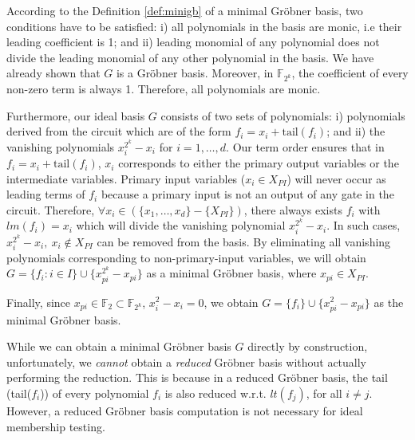 \begin{Proof}
According to the Definition \ref{def:minigb} of a minimal Gr\"obner basis, two
conditions have to be satisfied: i) all polynomials in the basis are
monic, i.e their leading coefficient is 1; and ii) leading monomial of
any polynomial does not divide the leading monomial of any other
polynomial in the basis. 
We have already shown that $G$ is a Gr\"obner basis. Moreover, in
$\mathbb{F}_{2^k}$, the coefficient of every non-zero term is always
1. Therefore, all polynomials are monic. 

Furthermore, our ideal basis $G$ consists of two sets of polynomials:
i) polynomials derived from the circuit which are of the form $f_i =
x_i + \text{tail}(f_i)$; and ii) the vanishing polynomials $x_i^{2^k}
- x_i$ for $i = 1, \dots, d$. Our term order ensures that in $f_i =
x_i + \text{tail}(f_i)$, $x_i$ corresponds to either the primary
output variables or the intermediate variables. Primary input
variables ($x_i \in X_{PI}$) will never occur as leading terms of
$f_i$ because a primary input is not an output of any gate in the
circuit. Therefore,  $\forall x_i \in (\{x_1, \ldots,
x_d\}-\{X_{PI}\})$, there always exists $f_{i}$ with
$lm(f_{i})=x_{i}$ which will divide the vanishing polynomial
$x_i^{2^k} - x_i$. In such cases, $x_{i}^{2^k}-x_{i}, ~x_i \notin
X_{PI}$ can be removed from the basis. By eliminating all vanishing
polynomials corresponding to non-primary-input variables, we will
obtain $G =\{f_i: i \in I \} \cup \{x_{pi}^{2^k}-x_{pi}\}$ as a
minimal Gr\"obner basis, where $x_{pi}\in X_{PI}$.  

Finally, since $x_{pi}\in \mathbb{F}_{2} \subset \mathbb{F}_{2^k}$,
$x_i^2 - x_i = 0$, we obtain $G =\{f_i \} \cup \{x_{pi}^2-x_{pi}\}$ as
the minimal Gr\"obner basis.  
\end{Proof}



While we can obtain a minimal Gr\"obner basis $G$ directly by
construction, unfortunately, we {\it cannot} obtain a {\it reduced}
Gr\"obner basis without actually performing the reduction. This is
because in a reduced Gr\"obner basis, the tail (tail($f_i$)) of every
polynomial $f_i$ is also reduced w.r.t. $lt(f_j)$, for all $i\neq
j$. However, a reduced Gr\"obner basis computation is not necessary
for ideal membership testing. 

